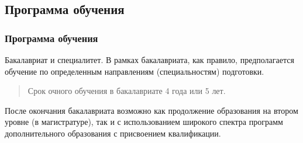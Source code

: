 \subsection{Программа обучения}

\begin{frame}
	\frametitle{Программа обучения}
     \alert{Бакалавриат и специалитет.} В рамках бакалавриата, как правило, предполагается обучение по определенным направлениям (специальностям) подготовки.
	
	\bigskip 	
    	\begin{quote}
    		Срок очного обучения в бакалавриате 4 года или 5 лет.
    	\end{quote}
	\bigskip 

     \alert{После окончания бакалавриата} возможно как продолжение образования на втором уровне (в магистратуре), так и с использованием широкого спектра программ дополнительного образования с присвоением квалификации.

\end{frame}